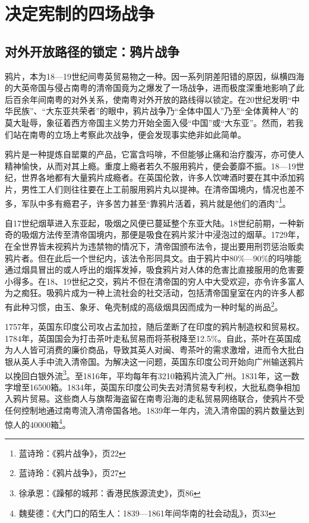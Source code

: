 \chapter{决定宪制的四场战争}

\section{对外开放路径的锁定：鸦片战争}

\indent 鸦片，本为18—19世纪间粤英贸易物之一种。因一系列阴差阳错的原因，纵横四海的大英帝国与侵占南粤的清帝国竟为之爆发了一场战争，进而极度深重地影响了此后百余年间南粤的对外关系，使南粤对外开放的路线得以锁定。在20世纪发明“中华民族”、“大东亚共荣者”的眼中，鸦片战争乃“全体中国人”乃至“全体黄种人”的莫大耻辱，象征着西方帝国主义势力开始全面入侵“中国”或“大东亚”。然而，若我们站在南粤的立场上考察此次战争，便会发现事实绝非如此简单。

鸦片是一种提炼自罂粟的产品，它富含吗啡，不但能够止痛和治疗腹泻，亦可使人精神愉快，从而对其上瘾。重度上瘾者若久不服用鸦片，便会萎靡不振。18—19世纪，世界各地都有大量鸦片成瘾者。在英国伦敦，许多人饮啤酒时要在其中添加鸦片，男性工人们则往往要在上工前服用鸦片丸以提神。在清帝国境内，情况也差不多，军队中多有瘾君子，许多苦力甚至“靠鸦片活着，鸦片就是他们的酒肉”\footnote{蓝诗玲：《鸦片战争》，页22}。

自17世纪烟草进入东亚起，吸烟之风便已蔓延整个东亚大陆。18世纪前期，一种新奇的吸烟方法传至清帝国境内，那便是吸食在鸦片浆汁中浸泡过的烟草。1729年，在全世界皆未视鸦片为违禁物的情况下，清帝国颁布法令，提出要用刑罚惩治贩卖鸦片者。但在此后一个世纪内，该法令形同具文。由于鸦片中80\%—90\%的吗啡能通过烟具冒出的或人呼出的烟挥发掉，吸食鸦片对人体的危害比直接服用的危害要小得多。在18、19世纪之交，鸦片不但在清帝国的穷人中大受欢迎，亦令许多富人为之痴狂。吸鸦片成为一种上流社会的社交活动，包括清帝国皇室在内的许多人都有此种习惯，由玉、象牙、龟壳制成的高级烟具因而成为一种时髦的尚品\footnote{蓝诗玲：《鸦片战争》，页27}。

1757年，英国东印度公司攻占孟加拉，随后垄断了在印度的鸦片制造权和贸易权。1784年，英国国会为打击茶叶走私贸易而将茶税降至12.5\%。自此，茶叶在英国成为人人皆可消费的廉价商品，导致其英人对闽、粤茶叶的需求激增，进而令大批白银从英人手中流入清帝国。为解决这一问题，英国东印度公司开始向广州输送鸦片以挽回白银外流\footnote{徐承恩：《躁郁的城邦：香港民族源流史》，页86}。至1816年，平均每年有3210箱鸦片流入广州。1831年，这一数字增至16500箱。1834年，英国东印度公司失去对清贸易专利权，大批私商争相加入鸦片贸易。这些商人与旗帮海盗留在南粤沿海的走私贸易网络联合，使鸦片不受任何控制地通过南粤流入清帝国各地。1839年一年内，流入清帝国的鸦片数量达到惊人的40000箱\footnote{魏斐德：《大门口的陌生人：1839—1861年间华南的社会动乱》，页33}。

